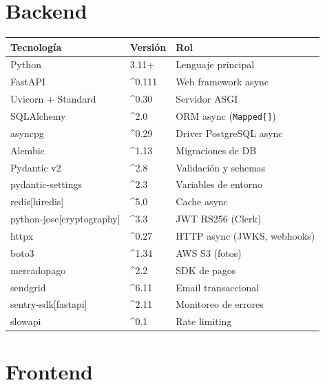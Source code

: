 \documentclass[12pt,a4paper]{report}
\begin{document}
\section{Backend}

\begin{center}
\begin{tabularx}{\textwidth}{L{4.5cm} L{2.5cm} X}
\toprule
\textbf{Tecnolog\'ia} & \textbf{Versi\'on} & \textbf{Rol} \\
\midrule
Python & 3.11+ & Lenguaje principal \\
FastAPI & \^{}0.111 & Web framework async \\
Uvicorn + Standard & \^{}0.30 & Servidor ASGI \\
SQLAlchemy & \^{}2.0 & ORM async (\texttt{Mapped[]}) \\
asyncpg & \^{}0.29 & Driver PostgreSQL async \\
Alembic & \^{}1.13 & Migraciones de DB \\
Pydantic v2 & \^{}2.8 & Validaci\'on y schemas \\
pydantic-settings & \^{}2.3 & Variables de entorno \\
redis[hiredis] & \^{}5.0 & Cache async \\
python-jose[cryptography] & \^{}3.3 & JWT RS256 (Clerk) \\
httpx & \^{}0.27 & HTTP async (JWKS, webhooks) \\
boto3 & \^{}1.34 & AWS S3 (fotos) \\
mercadopago & \^{}2.2 & SDK de pagos \\
sendgrid & \^{}6.11 & Email transaccional \\
sentry-sdk[fastapi] & \^{}2.11 & Monitoreo de errores \\
slowapi & \^{}0.1 & Rate limiting \\
\bottomrule
\end{tabularx}
\end{center}

\section{Frontend}
\end{document}

